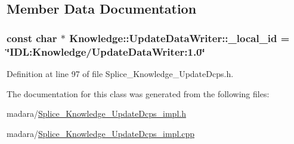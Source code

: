 \subsection{Member Data Documentation}
\hypertarget{classKnowledge_1_1UpdateDataWriter_a595ca0d99b00834ed9c834535e34c224}{
\subsubsection[{\_\-local\_\-id}]{\setlength{\rightskip}{0pt plus 5cm}const char $\ast$ {\bf Knowledge::UpdateDataWriter::\_\-local\_\-id} = \char`\"{}IDL:Knowledge/UpdateDataWriter:1.0\char`\"{}}}
\label{d9/dbb/classKnowledge_1_1UpdateDataWriter_a595ca0d99b00834ed9c834535e34c224}


Definition at line 97 of file Splice\_\-Knowledge\_\-UpdateDcps.h.



The documentation for this class was generated from the following files:\begin{DoxyCompactItemize}
\item 
madara/\hyperlink{Splice__Knowledge__UpdateDcps__impl_8h}{Splice\_\-Knowledge\_\-UpdateDcps\_\-impl.h}\item 
madara/\hyperlink{Splice__Knowledge__UpdateDcps__impl_8cpp}{Splice\_\-Knowledge\_\-UpdateDcps\_\-impl.cpp}\end{DoxyCompactItemize}
